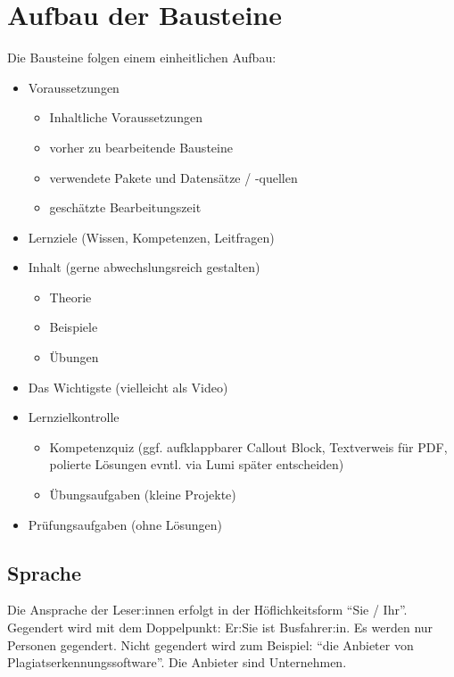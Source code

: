 \documentclass[
  letterpaper,
  DIV=11]{scrartcl}
\begin{document}
\section{Aufbau der Bausteine}\label{aufbau-der-bausteine}

Die Bausteine folgen einem einheitlichen Aufbau:

\begin{itemize}
\item
  Voraussetzungen

  \begin{itemize}
  \item
    Inhaltliche Voraussetzungen
  \item
    vorher zu bearbeitende Bausteine
  \item
    verwendete Pakete und Datensätze / -quellen
  \item
    geschätzte Bearbeitungszeit
  \end{itemize}
\item
  Lernziele (Wissen, Kompetenzen, Leitfragen)
\item
  Inhalt (gerne abwechslungsreich gestalten)

  \begin{itemize}
  \item
    Theorie
  \item
    Beispiele
  \item
    Übungen
  \end{itemize}
\item
  Das Wichtigste (vielleicht als Video)
\item
  Lernzielkontrolle

  \begin{itemize}
  \item
    Kompetenzquiz (ggf. aufklappbarer Callout Block, Textverweis für
    PDF, polierte Lösungen evntl. via Lumi später entscheiden)
  \item
    Übungsaufgaben (kleine Projekte)
  \end{itemize}
\item
  Prüfungsaufgaben (ohne Lösungen)
\end{itemize}

\subsection{Sprache}\label{sprache}

Die Ansprache der Leser:innen erfolgt in der Höflichkeitsform ``Sie /
Ihr''. Gegendert wird mit dem Doppelpunkt: Er:Sie ist Busfahrer:in. Es
werden nur Personen gegendert. Nicht gegendert wird zum Beispiel: ``die
Anbieter von Plagiatserkennungssoftware''. Die Anbieter sind
Unternehmen.
\end{document}
